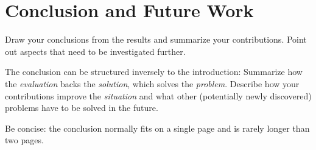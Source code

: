 \chapter{Conclusion and Future Work}
\label{ch:conclusion}

{\color{red}
	Draw your conclusions from the results and summarize your contributions.
	Point out aspects that need to be investigated further.

	The conclusion can be structured inversely to the introduction:
	Summarize how the \emph{evaluation} backs the \emph{solution}, which solves the \emph{problem}.
	Describe how your contributions improve the \emph{situation} and what other (potentially newly discovered) problems have to be solved in the future.

	Be concise: the conclusion normally fits on a single page and is rarely longer than two pages.
}
